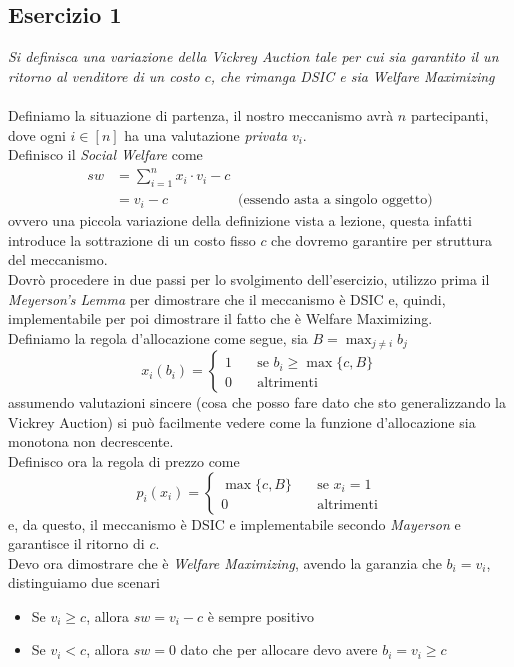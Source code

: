 \documentclass{article}
\begin{document}
        \subsection{Esercizio 1}\label{e21}
            \textit{Si definisca una variazione della Vickrey Auction tale per cui sia garantito il un ritorno al venditore di un costo $ c $, che rimanga DSIC e sia Welfare Maximizing}\\
            \\
            Definiamo la situazione di partenza, il nostro meccanismo avrà $ n $ partecipanti, dove ogni $ i \in [n] $ ha una valutazione \textit{privata} $ v_i $.\\
            Definisco il \textit{Social Welfare} come
            \[
                \begin{aligned}
                    sw &= \sum_{i=1}^{n} x_i \cdot v_i - c\\   
                       &= v_i - c \quad\quad\quad\quad\quad \text{(essendo asta a singolo oggetto)}
                \end{aligned}
            \]
            ovvero una piccola variazione della definizione vista a lezione, questa infatti introduce la sottrazione di un costo fisso $ c $ che dovremo garantire per struttura del meccanismo.\\
            Dovrò procedere in due passi per lo svolgimento dell'esercizio, utilizzo prima il \textit{Meyerson's Lemma} per dimostrare che il meccanismo è DSIC e, quindi, implementabile per poi dimostrare il fatto che è Welfare Maximizing.\\
            Definiamo la regola d'allocazione come segue, sia $ B = \max_{j \neq i} b_j $
            \[
                x_i(b_i) = \begin{cases}
                    1\quad &\text{se } b_i \geq \max\{c, B\}\\
                    0\quad &\text{altrimenti}
                \end{cases}    
            \]
            assumendo valutazioni sincere (cosa che posso fare dato che sto generalizzando la Vickrey Auction) si può facilmente vedere come la funzione d'allocazione sia monotona non decrescente.\\
            Definisco ora la regola di prezzo come
            \[
                p_i(x_i) = \begin{cases}
                    \max\{c,B\}\quad &\text{se } x_i = 1\\
                    0\quad &\text{altrimenti}
                \end{cases}    
            \]
            e, da questo, il meccanismo è DSIC e implementabile secondo \textit{Mayerson} e garantisce il ritorno di $ c $.\\
            Devo ora dimostrare che è \textit{Welfare Maximizing}, avendo la garanzia che $ b_i = v_i $, distinguiamo due scenari
            \begin{itemize}
                \item Se $ v_i \geq c $, allora $ sw = v_i - c $ è sempre positivo
                \item Se $ v_i < c $, allora $ sw = 0 $ dato che per allocare devo avere $ b_i = v_i \geq c $
            \end{itemize}
        \newpage
\end{document}
